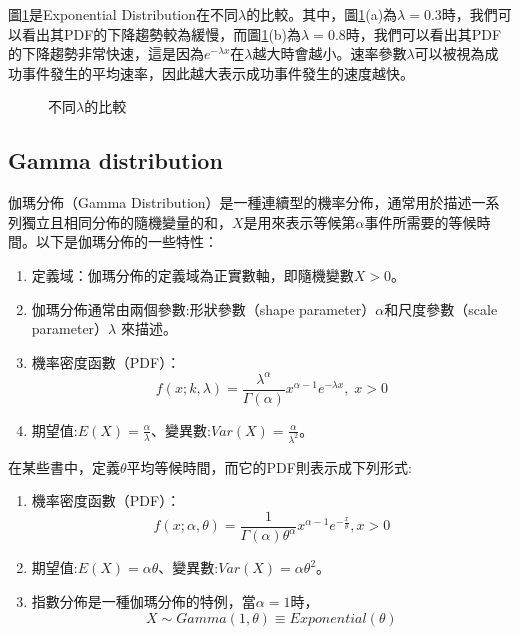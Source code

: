 \documentclass[12pt, a4paper]{article}
\begin{document}
圖\;\ref{fig:parallel3_6}\;是Exponential Distribution在不同\;$\lambda$\;的比較。其中，圖\;\ref{fig:parallel3_6}\;(a)\;為\;$\lambda=0.3$\;時，我們可以看出其PDF的下降趨勢較為緩慢，而圖\;\ref{fig:parallel3_6}\;(b)\;為\;$\lambda=0.8$\;時，我們可以看出其PDF的下降趨勢非常快速，這是因為\;$e^{-\lambda x}$\;在\;$\lambda$\;越大時會越小。速率參數\;$\lambda$\;可以被視為成功事件發生的平均速率，因此越大表示成功事件發生的速度越快。

\begin{figure}[h]
\centering
{}
\caption{不同$\lambda$的比較}
\label{fig:parallel3_6}
\end{figure}

\subsection{Gamma distribution}
伽瑪分佈（Gamma Distribution）是一種連續型的機率分佈，通常用於描述一系列獨立且相同分佈的隨機變量的和，\;$X$\;是用來表示等候第\;$\alpha$\;事件所需要的等候時間。以下是伽瑪分佈的一些特性\;：
\begin{enumerate}
\item 定義域：伽瑪分佈的定義域為正實數軸，即隨機變數\;$X>0$\;。
\item 伽瑪分佈通常由兩個參數\;:\;形狀參數（shape parameter）\;$\alpha$\;和尺度參數（scale parameter）\;$\lambda $ \;來描述。
\item 機率密度函數（PDF）\;：
$$ f(x;k,\lambda) = \frac{\lambda^\alpha}{\Gamma(\alpha)} x^{\alpha-1} e^{-\lambda x},\;x>0$$
\item 期望值\;:\;$E(X) = \frac{\alpha}{\lambda}$\;、變異數\;:\;$Var(X) = \frac{\alpha}{\lambda^2}$。
\end{enumerate}

在某些書中，定義\;$\theta$\;平均等候時間，而它的PDF則表示成下列形式\;:
\begin{enumerate}
\item 機率密度函數（PDF）\;：
$$ f(x;\alpha,\theta) = \frac{1}{\Gamma (\alpha) \theta^\alpha} x^{\alpha -1} e^{- \frac{x}{\theta}}, x>0$$
\item 期望值\;:\;$E(X) = \alpha \theta$\;、變異數\;:\;$Var(X) = \alpha \theta^2$。
\item 指數分佈是一種伽瑪分佈的特例，當\;$\alpha=1$\;時，
$$X\sim Gamma(1, \theta)\equiv Exponential(\theta)$$
\end{enumerate}
\end{document}
